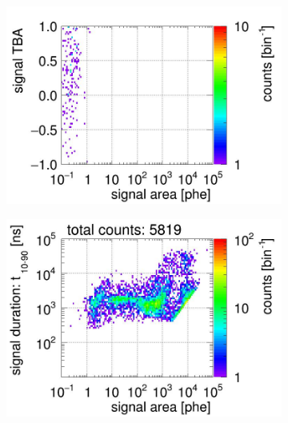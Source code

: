 \begin{landscape}
\begin{figure}[!p]
\begin{subfigure}[t]{0.33\textwidth}
		\includegraphics[width=\figurewidth,clip,trim={0 0 0 40}]{Figures/GasTest/CutsValid/res64767/tbapaX04Vecfig64767.jpg}
		\caption{}
		\label{fig:signal selection 04}
	\end{subfigure}
	\begin{subfigure}[t]{0.33\textwidth}
	\centering
		\includegraphics[width=\figurewidth,clip,trim={0 98 0 0}]{Figures/GasTest/CutsValid/res64767/pdpa05Vecfig64767.jpg}

\end{subfigure}
\end{figure}
\end{landscape}
